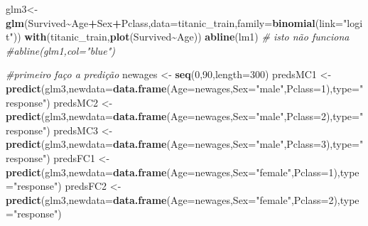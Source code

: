 \documentclass[
]{book}
\newenvironment{Shaded}{\begin{snugshade}}{\end{snugshade}}
\newcommand{\AttributeTok}[1]{\textcolor[rgb]{0.13,0.29,0.53}{#1}}
\newcommand{\CommentTok}[1]{\textcolor[rgb]{0.56,0.35,0.01}{\textit{#1}}}
\newcommand{\DecValTok}[1]{\textcolor[rgb]{0.00,0.00,0.81}{#1}}
\newcommand{\FunctionTok}[1]{\textcolor[rgb]{0.13,0.29,0.53}{\textbf{#1}}}
\newcommand{\NormalTok}[1]{#1}
\newcommand{\OtherTok}[1]{\textcolor[rgb]{0.56,0.35,0.01}{#1}}
\newcommand{\SpecialCharTok}[1]{\textcolor[rgb]{0.81,0.36,0.00}{\textbf{#1}}}
\newcommand{\StringTok}[1]{\textcolor[rgb]{0.31,0.60,0.02}{#1}}
\begin{document}
\begin{Shaded}
\begin{Highlighting}[]
\NormalTok{glm3}\OtherTok{\textless{}{-}}\FunctionTok{glm}\NormalTok{(Survived}\SpecialCharTok{\textasciitilde{}}\NormalTok{Age}\SpecialCharTok{+}\NormalTok{Sex}\SpecialCharTok{+}\NormalTok{Pclass,}\AttributeTok{data=}\NormalTok{titanic\_train,}\AttributeTok{family=}\FunctionTok{binomial}\NormalTok{(}\AttributeTok{link=}\StringTok{"logit"}\NormalTok{))}
\FunctionTok{with}\NormalTok{(titanic\_train,}\FunctionTok{plot}\NormalTok{(Survived}\SpecialCharTok{\textasciitilde{}}\NormalTok{Age))}
\FunctionTok{abline}\NormalTok{(lm1)}
\CommentTok{\# isto não funciona}
\CommentTok{\#abline(glm1,col="blue")}

\CommentTok{\#primeiro faço a predição}
\NormalTok{newages }\OtherTok{\textless{}{-}} \FunctionTok{seq}\NormalTok{(}\DecValTok{0}\NormalTok{,}\DecValTok{90}\NormalTok{,}\AttributeTok{length=}\DecValTok{300}\NormalTok{)}
\NormalTok{predsMC1 }\OtherTok{\textless{}{-}} \FunctionTok{predict}\NormalTok{(glm3,}\AttributeTok{newdata=}\FunctionTok{data.frame}\NormalTok{(}\AttributeTok{Age=}\NormalTok{newages,}\AttributeTok{Sex=}\StringTok{"male"}\NormalTok{,}\AttributeTok{Pclass=}\DecValTok{1}\NormalTok{),}\AttributeTok{type=}\StringTok{"response"}\NormalTok{)}
\NormalTok{predsMC2 }\OtherTok{\textless{}{-}} \FunctionTok{predict}\NormalTok{(glm3,}\AttributeTok{newdata=}\FunctionTok{data.frame}\NormalTok{(}\AttributeTok{Age=}\NormalTok{newages,}\AttributeTok{Sex=}\StringTok{"male"}\NormalTok{,}\AttributeTok{Pclass=}\DecValTok{2}\NormalTok{),}\AttributeTok{type=}\StringTok{"response"}\NormalTok{)}
\NormalTok{predsMC3 }\OtherTok{\textless{}{-}} \FunctionTok{predict}\NormalTok{(glm3,}\AttributeTok{newdata=}\FunctionTok{data.frame}\NormalTok{(}\AttributeTok{Age=}\NormalTok{newages,}\AttributeTok{Sex=}\StringTok{"male"}\NormalTok{,}\AttributeTok{Pclass=}\DecValTok{3}\NormalTok{),}\AttributeTok{type=}\StringTok{"response"}\NormalTok{)}
\NormalTok{predsFC1 }\OtherTok{\textless{}{-}} \FunctionTok{predict}\NormalTok{(glm3,}\AttributeTok{newdata=}\FunctionTok{data.frame}\NormalTok{(}\AttributeTok{Age=}\NormalTok{newages,}\AttributeTok{Sex=}\StringTok{"female"}\NormalTok{,}\AttributeTok{Pclass=}\DecValTok{1}\NormalTok{),}\AttributeTok{type=}\StringTok{"response"}\NormalTok{)}
\NormalTok{predsFC2 }\OtherTok{\textless{}{-}} \FunctionTok{predict}\NormalTok{(glm3,}\AttributeTok{newdata=}\FunctionTok{data.frame}\NormalTok{(}\AttributeTok{Age=}\NormalTok{newages,}\AttributeTok{Sex=}\StringTok{"female"}\NormalTok{,}\AttributeTok{Pclass=}\DecValTok{2}\NormalTok{),}\AttributeTok{type=}\StringTok{"response"}\NormalTok{)}

\end{Highlighting}
\end{Shaded}
\end{document}
